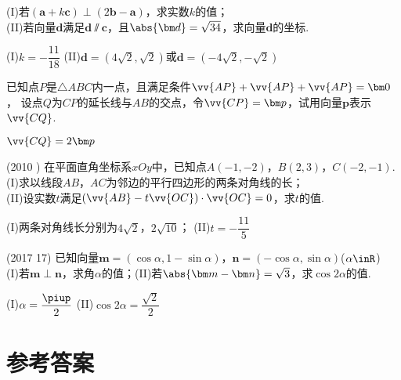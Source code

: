 \begin{exercise}
    (I)若$(\bm a+k\bm c)\perp(2\bm b-\bm a)$，求实数$k$的值；\\
    (II)若向量$\bm d$满足$\bm d\varparallel\bm c$，且$\abs{\bm d}=\sqrt{34}$，求向量$\bm d$的坐标.
    \begin{answer}
      (I)$k=-\dfrac{11}{18}$
      (II)$\bm d=(4\sqrt2,\sqrt2)$或$\bm d=(-4\sqrt2,-\sqrt2)$
    \end{answer}
  \vspace{5cm}
  \item
    已知点$P$是$\triangle{ABC}$内一点，且满足条件$\vv{AP}+\vv{AP}+\vv{AP}=\bm 0$，
    设点$Q$为$CP$的延长线与$AB$的交点，令$\vv{CP}=\bm p$，试用向量$\bm p$表示$\vv{CQ}$.
    \begin{answer}
      $\vv{CQ}=2\bm p$
    \end{answer}
  \vspace{6cm}
  \item%
    (2010 )
    在平面直角坐标系$xOy$中，已知点$A(-1,-2)$，$B(2,3)$，$C(-2,-1)$.\\
    (I)求以线段$AB$，$AC$为邻边的平行四边形的两条对角线的长；\\
    (II)设实数$t$满足$(\vv{AB}-t\vv{OC})\cdot\vv{OC}=0$，求$t$的值.
    \begin{answer}
      (I)两条对角线长分别为$4\sqrt2$，$2\sqrt{10}$；
      (II)$t=-\dfrac{11}5$
    \end{answer}
  \vspace{5.5cm}
  \item%
    (2017  17)
    已知向量$\bm m=(\cos\alpha,1-\sin\alpha)$，$\bm n=(-\cos\alpha,\sin\alpha)$($\alpha\inR$)\\
    (I)若$\bm m\perp\bm n$，求角$\alpha$的值；\qquad (II)若$\abs{\bm m-\bm n}=\sqrt3$，求$\cos{2\alpha}$的值.
    \begin{answer}
      (I)$\alpha=\dfrac{\piup}2$
      (II)$\cos{2\alpha}=\dfrac{\sqrt2}2$
    \end{answer}
\end{exercise}
\stopexercise

\newpage
\section{参考答案}
\begin{multicols}{2}
  \printanswer
\end{multicols}
